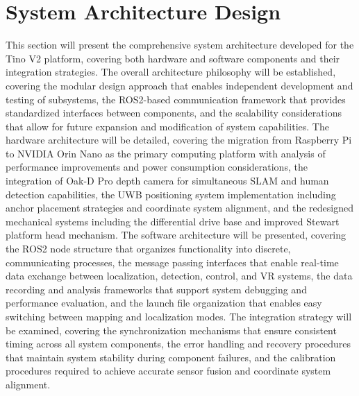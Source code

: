 \section{System Architecture Design}
This section will present the comprehensive system architecture developed for the Tino V2 platform, covering both hardware and software components and their integration strategies. The overall architecture philosophy will be established, covering the modular design approach that enables independent development and testing of subsystems, the ROS2-based communication framework that provides standardized interfaces between components, and the scalability considerations that allow for future expansion and modification of system capabilities. The hardware architecture will be detailed, covering the migration from Raspberry Pi to NVIDIA Orin Nano as the primary computing platform with analysis of performance improvements and power consumption considerations, the integration of Oak-D Pro depth camera for simultaneous SLAM and human detection capabilities, the UWB positioning system implementation including anchor placement strategies and coordinate system alignment, and the redesigned mechanical systems including the differential drive base and improved Stewart platform head mechanism. The software architecture will be presented, covering the ROS2 node structure that organizes functionality into discrete, communicating processes, the message passing interfaces that enable real-time data exchange between localization, detection, control, and VR systems, the data recording and analysis frameworks that support system debugging and performance evaluation, and the launch file organization that enables easy switching between mapping and localization modes. The integration strategy will be examined, covering the synchronization mechanisms that ensure consistent timing across all system components, the error handling and recovery procedures that maintain system stability during component failures, and the calibration procedures required to achieve accurate sensor fusion and coordinate system alignment.

